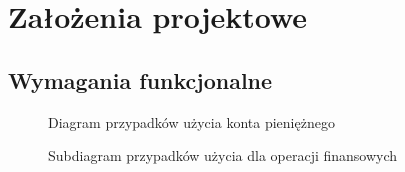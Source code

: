 \chapter{Założenia projektowe}
\label{chap:zalozenia-projektowe}
\section{Wymagania funkcjonalne}
\label{sec:wymagania-funkcjonalne}



\begin{figure}[p]
	\centering
	\caption{Diagram przypadków użycia konta pieniężnego}
	\label{fig:use-case-account}
\end{figure}

\begin{figure}[p]
	\centering
	\caption{Subdiagram przypadków użycia dla operacji finansowych}
	\label{fig:use-case-money}
\end{figure}

